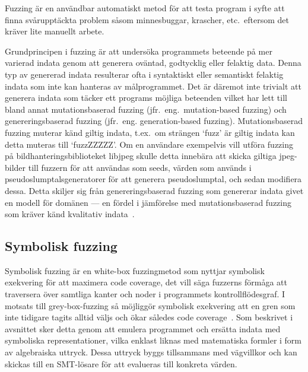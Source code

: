 Fuzzing är en användbar automatiskt metod för att testa program i syfte att finna
svårupptäckta problem såsom minnesbuggar, krascher, etc.\ eftersom det kräver lite
manuellt arbete.

Grundprincipen i fuzzing är att undersöka programmets beteende på mer varierad
indata genom att generera oväntad, godtycklig eller felaktig data. Denna typ av
genererad indata resulterar ofta i syntaktiskt eller semantiskt felaktig indata
som inte kan hanteras av målprogrammet. Det är däremot inte trivialt att generera
indata som täcker ett programs möjliga beteenden vilket har lett till bland annat
mutationsbaserad fuzzing (jfr.\ eng.\ mutation-based fuzzing) och genereringsbaserad
fuzzing (jfr.\ eng. generation-based fuzzing). Mutationsbaserad fuzzing muterar känd giltig indata,
t.ex.\ om strängen `fuzz' är giltig indata kan detta muteras till `fuzzZZZZZ'. Om
en användare exempelvis vill utföra fuzzing på bildhanteringsbiblioteket libjpeg skulle
detta innebära att skicka giltiga jpeg-bilder till fuzzern för att användas som
seeds, värden som används i pseudoslumptalsgeneratorer för att generera
pseudoslumptal, och sedan modifiera dessa. Detta skiljer sig från
genereringsbaserad fuzzing som genererar indata givet en modell för domänen ---
en fördel i jämförelse med mutationsbaserad fuzzing som kräver känd kvalitativ
indata~\cite{fuzzing}.

\subsection{Symbolisk fuzzing} Symbolisk fuzzing är en white-box fuzzingmetod
som nyttjar symbolisk exekvering för att maximera code coverage, det vill säga fuzzerns
förmåga att traversera över samtliga kanter och noder i programmets kontrollflödesgraf.
I motsats till grey-box-fuzzing så möjliggör symbolisk exekvering att en gren som inte tidigare tagits alltid väljs
och ökar således code coverage~\cite{challenges_fuzzing}. Som beskrivet i avsnittet 
sker detta genom att emulera programmet och ersätta indata med symboliska representationer, vilka enklast liknas med
matematiska formler i form av algebraiska uttryck. Dessa uttryck byggs tillsammans med vägvillkor
och kan skickas till en SMT-lösare för att evalueras till konkreta värden.

